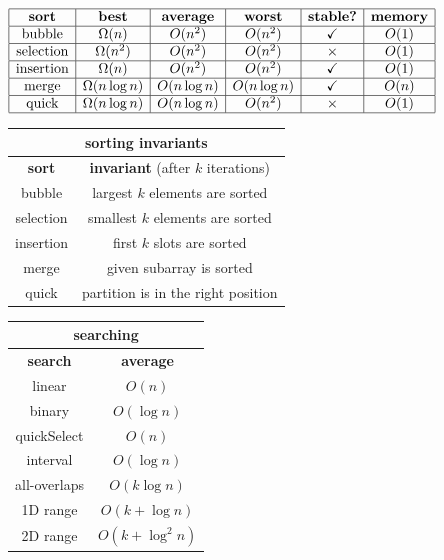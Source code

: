 \documentclass[10pt, landscape]{article}
\newenvironment{tightcenter}{%
  \setlength\topsep{0pt}
  \setlength\parskip{0pt}
  \begin{center}
}{%
  \end{center}
}
\begin{document}
\begin{multicols}{3}
    \begin{tightcenter}
        $
        \begin{array}{| c | c | c | c | c | c |}
            \hline\textbf{sort} & \textbf{best} & \textbf{average} & \textbf{worst} & \textbf{stable?} & \textbf{memory}
    
            \\\hline\text{bubble} & \Omega(n) & O(n^2) & O(n^2) & \checkmark & O(1)
            
            \\\hline\text{selection} & \Omega(n^2) & O(n^2) & O(n^2) & \times & O(1)
            
            \\\hline\text{insertion} & \Omega(n) & O(n^2) & O(n^2) & \checkmark & O(1)
            
            \\\hline\text{merge} & \Omega(n\log n) & O(n\log n) & O(n\log n) & \checkmark & O(n)
            
            \\\hline\text{quick} & \Omega(n\log n) & O(n\log n) & O(n^2) & \times & O(1)
            \\\hline
        \end{array} 
        $\
        \begin{tabular}{| c | c |}
            \multicolumn{2}{c}{sorting invariants}
            \\\hline\textbf{sort} & \textbf{invariant} (after $k$ iterations)
            \\\hline bubble & largest $k$ elements are sorted
            \\\hline selection & smallest $k$ elements are sorted
            \\\hline insertion & first $k$ slots are sorted
            \\\hline merge & given subarray is sorted
            \\\hline quick & partition is in the right position
            \\\hline
        \end{tabular} \begin{tabular}{| c | c |}
            \multicolumn{2}{c}{searching}\\\hline
            \textbf{search} & \textbf{average} \\\hline
            linear & $O(n)$ \\\hline
            binary & $O(\log n)$ \\\hline
            quickSelect & $O(n)$ \\\hline
            interval & $O(\log n)$ \\\hline
            all-overlaps & $O(k\log n)$ \\\hline
            1D range & $O(k + \log n)$ \\\hline
            2D range & $O(k + \log^2 n)$ \\\hline
        \end{tabular}
        

\end{tightcenter}
\end{multicols}
\end{document}

